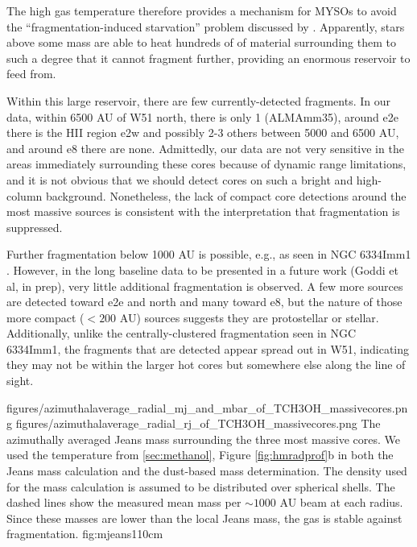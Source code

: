 \documentclass{aa}
\begin{document}
The high gas temperature therefore provides a mechanism for MYSOs to avoid
the ``fragmentation-induced starvation'' problem discussed by
\citet{Peters2010a,Peters2010c,Girichidis2012b}.  Apparently, stars above
some mass are able to heat hundreds of \msun of material surrounding them
to such a degree that it cannot fragment further, providing an enormous
reservoir to feed from.

Within this large reservoir, there are few currently-detected fragments.
In our data, within 6500 AU of W51 north, there is only 1 (ALMAmm35), around
e2e there is the HII region e2w and possibly 2-3 others between 5000 and 6500
AU, and around e8 there are none.  Admittedly, our data are not very sensitive
in the areas immediately surrounding these cores because of dynamic
range limitations, and it is not obvious that we should detect cores on such
a bright and high-column background.  Nonetheless, the lack of compact core
detections around the most massive sources is consistent with the interpretation
that fragmentation is suppressed.

Further fragmentation below 1000 AU is possible, e.g., as seen in NGC 6334Imm1
\citep{Brogan2016a}.  However, in the long baseline data to be presented in a
future work (Goddi et al, in prep), very little additional fragmentation is
observed.  A few more sources are detected toward e2e and north and many toward
e8, but the nature of those more compact ($<200$ AU) sources suggests they are
protostellar or stellar.  Additionally, unlike the centrally-clustered
fragmentation seen in NGC 6334Imm1, the fragments that are detected appear
spread out in W51, indicating they may not be within the larger hot cores but
somewhere else along the line of sight.

\FigureTwo
{figures/azimuthalaverage_radial_mj_and_mbar_of_TCH3OH_massivecores.png}
{figures/azimuthalaverage_radial_rj_of_TCH3OH_massivecores.png}
{The azimuthally averaged Jeans mass surrounding the
three most massive cores.  We used the \methanol temperature from
\ref{sec:methanol}, Figure \ref{fig:hmradprof}b in both the Jeans mass
calculation and the dust-based mass determination.
The density used for the mass calculation is assumed to be distributed
over spherical shells.  The dashed lines show the measured mean mass per
$\sim1000$ AU beam at each radius.  Since these masses are lower than
the local Jeans mass, the gas is stable against fragmentation.
}
{fig:mjeans}{1}{10cm}
\end{document}
